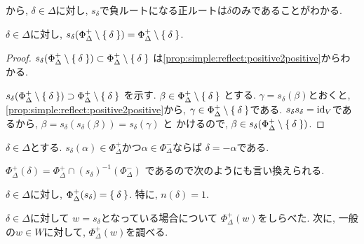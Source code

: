 から,
$\delta\in\Delta$に対し,
$s_\delta$で負ルートになる正ルートは$\delta$のみであることがわかる.
\begin{cor}
  $\delta\in\Delta$に対し,
  $s_\delta(\Phi_\Delta^+\setminus\Set{\delta})=\Phi_\Delta^+\setminus\Set{\delta}$.
\end{cor}
\begin{proof}
$s_\delta(\Phi_\Delta^+\setminus\Set{\delta})\subset\Phi_\Delta^+\setminus\Set{\delta}$
は\cref{prop:simple:reflect:positive2positive}からわかる.

$s_\delta(\Phi_\Delta^+\setminus\Set{\delta})\supset\Phi_\Delta^+\setminus\Set{\delta}$
を示す.
$\beta\in\Phi_\Delta^+\setminus\Set{\delta}$
とする.
$\gamma=s_\delta(\beta)$とおくと,
\cref{prop:simple:reflect:positive2positive}から,
$\gamma\in \Phi_\Delta^+\setminus\Set{\delta}$である.
$s_\delta s_\delta=\operatorname{id}_V$であるから,
$\beta=s_\delta(s_\delta(\beta))=s_\delta(\gamma)$
と
かけるので, $\beta\in s_\delta(\Phi_\Delta^+\setminus\Set{\delta})$.
\end{proof}
\begin{cor}
  \label{thm:simple:action:x}
  $\delta\in\Delta$とする.
  $s_\delta(\alpha)\in\Phi_\Delta^+$かつ$\alpha\in\Phi_\Delta^-$ならば
  $\delta=-\alpha$である.
\end{cor}
$\Phi_\Delta^{+}(\delta)=\Phi_\Delta^+\cap (s_\delta)^{-1}(\Phi_\Delta^-)$
であるので次のようにも言い換えられる.
\begin{cor}
  $\delta\in\Delta$に対し,
  $\Phi_\Delta^{+}(s_\delta)=\Set{\delta}$.
  特に,
  $n(\delta)=1$.
\end{cor}

$\delta\in\Delta$に対して
$w=s_\delta$となっている場合について $\Phi_\Delta^+(w)$をしらべた.
次に, 一般の$w\in W$に対して,
$\Phi_\Delta^+(w)$を調べる.

